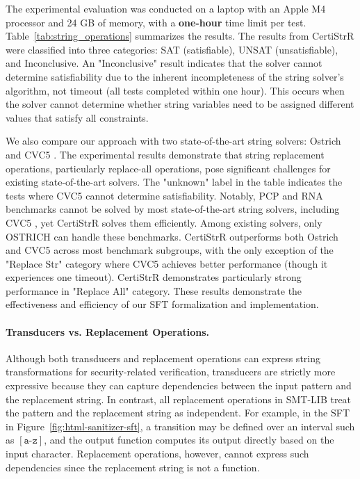 The experimental evaluation was conducted on a laptop with an Apple M4 processor and 24 GB of memory, with a \textbf{one-hour} time limit per test. Table~\ref{tab:string_operations} summarizes the results. The results from CertiStrR were classified into three categories: SAT (satisfiable), UNSAT (unsatisfiable), and Inconclusive. An "Inconclusive" result indicates that the solver cannot determine satisfiability due to the inherent incompleteness of the string solver's algorithm, not timeout (all tests completed within one hour). This occurs when the solver cannot determine whether string variables need to be assigned different values that satisfy all constraints. 

We also compare our approach with two state-of-the-art string solvers: Ostrich \cite{pacmpl/ChenFHHHKLRW22} and CVC5 \cite{cvc5}.
The experimental results demonstrate that string replacement operations, particularly replace-all operations, pose significant challenges for existing state-of-the-art solvers.
The "unknown" label in the table indicates the tests where CVC5 cannot determine satisfiability. 
Notably, PCP and RNA benchmarks cannot be solved by most state-of-the-art string
solvers, including CVC5 \cite{cvc5}, yet CertiStrR solves
them efficiently. Among existing solvers, only OSTRICH \cite{pacmpl/ChenFHHHKLRW22} can handle these benchmarks.
CertiStrR outperforms both Ostrich and CVC5 across most benchmark subgroups, with the only exception of the "Replace Str" category where CVC5 achieves better performance (though it experiences one timeout). CertiStrR demonstrates particularly strong performance in  "Replace All" category.
These results demonstrate the effectiveness and efficiency of our SFT formalization and implementation.

\paragraph{Transducers vs. Replacement Operations.}  
Although both transducers and replacement operations can express string
transformations for security-related verification, transducers are strictly more
expressive because they can capture dependencies between the input pattern and
the replacement string. In contrast, all replacement operations in SMT-LIB treat
the pattern and the replacement string as independent. For example, in the SFT
in Figure~\ref{fig:html-sanitizer-sft}, a transition may be defined over
an interval such as $[\texttt{a-z}]$, and the output function computes its
output directly based on the input character. Replacement operations, however,
cannot express such dependencies since the replacement string is not a function.

